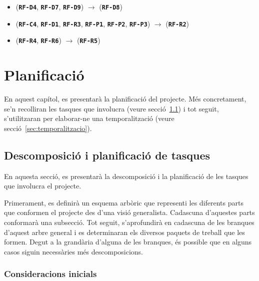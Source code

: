 \documentclass[a4paper,12pt]{ThesisStyle}
\begin{document}
\begin{itemize}
  \item (\texttt{\textbf{RF-D4}}, \texttt{\textbf{RF-D7}}, \texttt{\textbf{RF-D9}}) \hspace{1pt} $\longrightarrow$ \hspace{1pt} (\texttt{\textbf{RF-D8}})
  \item (\texttt{\textbf{RF-C4}}, \texttt{\textbf{RF-D1}}, \texttt{\textbf{RF-R3}}, \texttt{\textbf{RF-P1}}, \texttt{\textbf{RF-P2}}, \texttt{\textbf{RF-P3}}) \hspace{1pt} $\longrightarrow$ \hspace{1pt} (\texttt{\textbf{RF-R2}})
  \item (\texttt{\textbf{RF-R4}}, \texttt{\textbf{RF-R6}}) \hspace{1pt} $\longrightarrow$ \hspace{1pt} (\texttt{\textbf{RF-R5}})
\end{itemize}

\chapter{Planificació}
\label{cap:planificacio}

En aquest capítol, es presentarà la planificació del projecte. Més concretament, se'n recolliran les tasques que involucra (veure secció~\ref{sec:descomposicio_planificacio_tasques}) i tot seguit, s'utilitzaran per elaborar-ne una temporalització (veure secció~\ref{sec:temporalitzacio}).

\section{Descomposició i planificació de tasques}
\label{sec:descomposicio_planificacio_tasques}

En aquesta secció, es presentarà la descomposició i la planificació de les tasques que involucra el projecte.

Primerament, es definirà un esquema arbòric que representi les diferents parts que conformen el projecte des d'una visió generalista. Cadascuna d'aquestes parts conformarà una subsecció. Tot seguit, s'aprofundirà en cadascuna de les branques d'aquest arbre general i es determinaran els diversos paquets de treball que les formen. Degut a la grandària d'alguna de les branques, és possible que en alguns casos siguin necessàries més descomposicions.

\subsection{Consideracions inicials}
\label{subsec:planificacio_consideracions}
\end{document}
